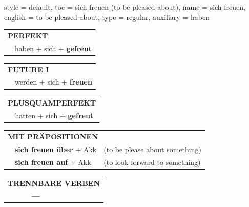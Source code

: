 \begin{verbentry}{
  style = {default},
  toc = {sich freuen (to be pleased about)},
  name = {sich freuen},
  english = {to be pleased about},
  type = {regular},
  auxiliary = {haben}
}
 \begin{tabular}{rl}
     \multicolumn{2}{l}{\textbf{PERFEKT}}\\
   &  haben + sich + \textbf{gefreut}\\
  \end{tabular}
\hfill
   \begin{tabular}{rl}
    \multicolumn{2}{l}{\textbf{FUTURE I} }\\
   & werden + sich + \textbf{freuen}\\
  \end{tabular}
\hfill
   \begin{tabular}{rl}
      \multicolumn{2}{l}{\textbf{PLUSQUAMPERFEKT}}\\
    & hatten + sich + \textbf{gefreut}\\
  \end{tabular}
  
\vspace{10pt}

   \begin{tabular}{lll}
      \multicolumn{3}{l}{\textbf{MIT PRÄPOSITIONEN}}\\
& \textbf{sich freuen über} + Akk & (to be please about something)\\
& \textbf{sich freuen auf} + Akk & (to look forward to something)
  \end{tabular}
  \hfill
   \begin{tabular}{lll}
\multicolumn{3}{l}{\textbf{TRENNBARE VERBEN}}\\
& \textbf{---} & \\
\end{tabular}



  \vspace{-5pt}
\end{verbentry}


